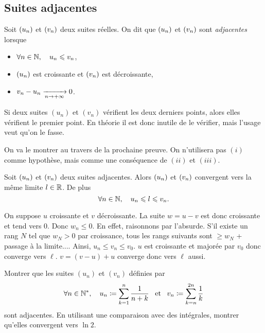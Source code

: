 \documentclass{magnolia}
\begin{document}
\subsection{Suites adjacentes}

\begin{definition}[utile=-3]
Soit $\left(u_n\right)$ et $\left(v_n\right)$ deux suites réelles. On dit que $\left(u_n\right)$ et
$\left(v_n\right)$ sont \emph{adjacentes} lorsque
\begin{itemize}
\item $\forall n\in\mathbb{N} ,\quad u_n \leqslant v_n$,
\item $\left(u_n\right)$ est croissante et $\left(v_n\right)$ est décroissante,
\item $v_n-u_n \xrightarrow[n\rightarrow +\infty]{} 0$.
\end{itemize}
\end{definition}

\begin{remarqueUnique}
\remarque Si deux suites $(u_n)$ et $(v_n)$ vérifient les deux derniers points,
  alors elles vérifient le premier point. En théorie il est donc inutile de
  le vérifier, mais l'usage veut qu'on le fasse.
\end{remarqueUnique}

\begin{sol}
On va le montrer au travers de la prochaine preuve. On n'utilisera pas $(i)$ comme hypothèse, mais comme une conséquence de $(ii)$ et $(iii)$.
\end{sol}

\begin{proposition}[utile=-3]
Soit $\left(u_n\right)$ et $\left(v_n\right)$ deux suites adjacentes. Alors $\left(u_n\right)$ et $\left(v_n\right)$
convergent vers la même limite $l\in\mathbb{R}$. De plus
\[\forall n\in\mathbb{N} ,\quad u_n \leqslant l \leqslant v_n.\]
\end{proposition}

\begin{preuve}
On suppose $u$ croissante et $v$ décroissante.
La suite $w=u-v$ est donc croissante et tend vers $0$. Donc $w_n\leq 0$. En effet, raisonnons par l'absurde. S'il existe un rang $N$ tel que $w_N>0$ par croissance, tous les rangs suivants sont $\geq w_N$ + passage à la limite.... Ainsi, $u_n\leq v_n\leq v_0$.
$u$ est croissante et majorée par $v_0$ donc converge vers $\ell$. $v=(v-u)+u$ converge donc vers $\ell$ aussi. 
\end{preuve}

\begin{exoUnique}
\exo Montrer que les suites $(u_n)$ et $(v_n)$ définies par
  \[\forall n\in{\mathbb{N}^*} ,\quad u_n\coloneqq\sum_{k=1}^n \frac{1}{n+k} \quad\!\text{et}\quad\!
    v_n\coloneqq\sum_{k=n}^{2n} \frac{1}{k}\]
  sont adjacentes. En utilisant une comparaison avec des intégrales, montrer
  qu'elles convergent vers $\ln 2$.
\end{exoUnique}
\end{document}
